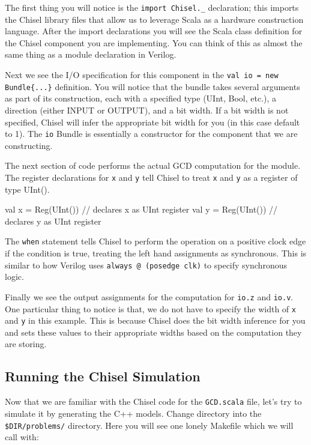 \documentclass[twocolumn, 10pt]{article}
\begin{document}
The first thing you will notice is the \verb+import Chisel._+ declaration; this imports the Chisel library files that allow us to leverage Scala as a hardware construction language. After the import declarations you will see the Scala class definition for the Chisel component you are implementing. You can think of this as almost the same thing as a module declaration in Verilog.

Next we see the I/O specification for this component in the \verb+val io = new Bundle{...}+ definition. You will notice that the bundle takes several arguments as part of its construction, each with a specified type (UInt, Bool, etc.), a direction (either INPUT or OUTPUT), and a bit width. If a bit width is not specified, Chisel will infer the appropriate bit width for you (in this case default to 1). The \verb+io+ Bundle is essentially a constructor for the component that we are constructing.

The next section of code performs the actual GCD computation for the module. The register declarations for \verb+x+ and \verb+y+ tell Chisel to treat \verb+x+ and \verb+y+ as a register of type UInt(). 

\begin{scala}
val x  = Reg(UInt())  // declares x as UInt register
val y  = Reg(UInt())  // declares y as UInt register
\end{scala}

The \verb+when+ statement tells Chisel to perform the operation on a positive clock edge if the condition is true, treating the left hand assignments as synchronous. This is similar to how Verilog uses \verb+always @ (posedge clk)+ to specify synchronous logic.

Finally we see the output assignments for the computation for \verb+io.z+ and \verb+io.v+. One particular thing to notice is that, we do not have to specify the width of \verb+x+ and \verb+y+ in this example. This is because Chisel does the bit width inference for you and sets these values to their appropriate widths based on the computation they are storing.

\subsection{Running the Chisel Simulation}

Now that we are familiar with the Chisel code for the \verb+GCD.scala+ file, let's try to simulate it by generating the C++ models. Change directory into the \verb+$DIR/problems/+ directory. Here you will see one lonely Makefile which we will call with:
\end{document}
